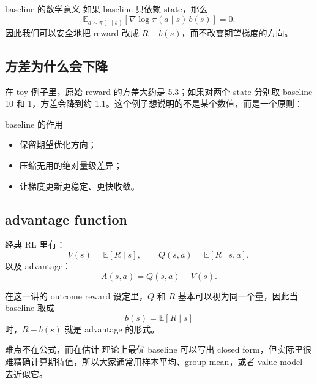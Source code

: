 \begin{knowledgebox}{baseline 的数学意义}
如果 baseline 只依赖 state，那么
\[
\mathbb{E}_{a \sim \pi(\cdot \mid s)}[\nabla \log \pi(a \mid s)\,b(s)] = 0.
\]
因此我们可以安全地把 reward 改成 $R-b(s)$，而不改变期望梯度的方向。
\end{knowledgebox}


\subsection{方差为什么会下降}

在 toy 例子里，原始 reward 的方差大约是 5.3；如果对两个 state 分别取 baseline 10 和 1，方差会降到约 1.1。这个例子想说明的不是某个数值，而是一个原则：

\begin{importantbox}{baseline 的作用}
\begin{itemize}
    \item 保留期望优化方向；
    \item 压缩无用的绝对量级差异；
    \item 让梯度更新更稳定、更快收敛。
\end{itemize}
\end{importantbox}


\subsection{advantage function}

经典 RL 里有：
\[
V(s) = \mathbb{E}[R \mid s], \qquad Q(s,a)=\mathbb{E}[R \mid s,a],
\]
以及 advantage：
\[
A(s,a)=Q(s,a)-V(s).
\]

在这一讲的 outcome reward 设定里，$Q$ 和 $R$ 基本可以视为同一个量，因此当 baseline 取成
\[
b(s) = \mathbb{E}[R \mid s]
\]
时，$R - b(s)$ 就是 advantage 的形式。

\begin{warningbox}{难点不在公式，而在估计}
理论上最优 baseline 可以写出 closed form，但实际里很难精确计算期待值，所以大家通常用样本平均、group mean，或者 value model 去近似它。
\end{warningbox}



